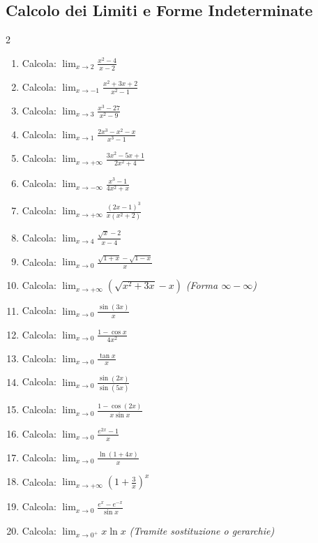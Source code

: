 \subsection{Calcolo dei Limiti e Forme Indeterminate}
\begin{multicols}{2}
\begin{enumerate}
    \item {} Calcola: $\lim_{x \to 2} \frac{x^2 - 4}{x - 2}$
    \item {} Calcola: $\lim_{x \to -1} \frac{x^2 + 3x + 2}{x^2 - 1}$
    \item {} Calcola: $\lim_{x \to 3} \frac{x^3 - 27}{x^2 - 9}$
    \item {} Calcola: $\lim_{x \to 1} \frac{2x^3 - x^2 - x}{x^3 - 1}$
    \item {} Calcola: $\lim_{x \to +\infty} \frac{3x^2 - 5x + 1}{2x^2 + 4}$
    \item {} Calcola: $\lim_{x \to -\infty} \frac{x^3 - 1}{4x^2 + x}$
    \item {} Calcola: $\lim_{x \to +\infty} \frac{(2x-1)^3}{x(x^2+2)}$
    \item {} Calcola: $\lim_{x \to 4} \frac{\sqrt{x} - 2}{x - 4}$
    \item {} Calcola: $\lim_{x \to 0} \frac{\sqrt{1+x} - \sqrt{1-x}}{x}$
    \item {} Calcola: $\lim_{x \to +\infty} (\sqrt{x^2+3x} - x)$ \textit{(Forma $\infty - \infty$)}
    \item {} Calcola: $\lim_{x \to 0} \frac{\sin(3x)}{x}$
    \item {} Calcola: $\lim_{x \to 0} \frac{1 - \cos x}{4x^2}$
    \item {} Calcola: $\lim_{x \to 0} \frac{\tan x}{x}$
    \item {} Calcola: $\lim_{x \to 0} \frac{\sin(2x)}{\sin(5x)}$
    \item {} Calcola: $\lim_{x \to 0} \frac{1 - \cos(2x)}{x \sin x}$
    \item {} Calcola: $\lim_{x \to 0} \frac{e^{2x} - 1}{x}$
    \item {} Calcola: $\lim_{x \to 0} \frac{\ln(1+4x)}{x}$
    \item {} Calcola: $\lim_{x \to +\infty} \left(1 + \frac{3}{x}\right)^x$
    \item {} Calcola: $\lim_{x \to 0} \frac{e^x - e^{-x}}{\sin x}$
    \item {} Calcola: $\lim_{x \to 0^+} x \ln x$ \textit{(Tramite sostituzione o gerarchie)}
\end{enumerate}
\end{multicols}

